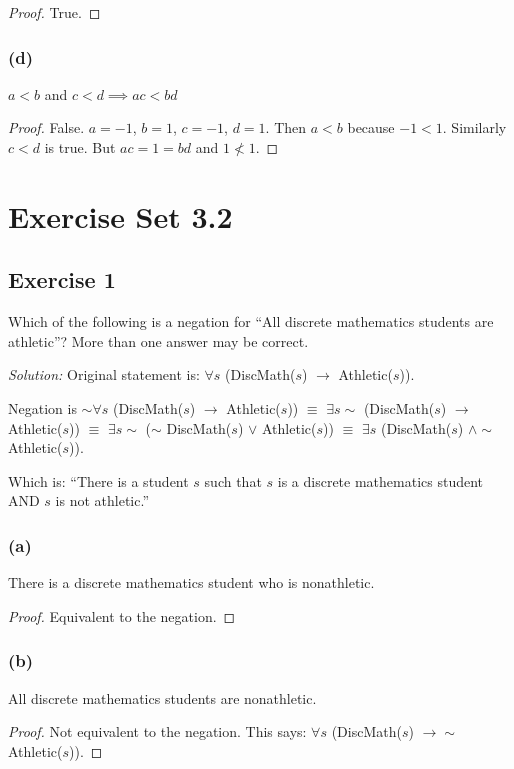 \documentclass[14pt]{extarticle}
\newcommand{\fa}{\forall}
\newcommand{\te}{\exists}
\begin{document}
\begin{proof}
    True.
\end{proof}

\subsubsection{(d)}
$a < b$ and $c < d \implies ac < bd$

\begin{proof}
    False. $a = -1$, $b = 1$, $c = -1$, $d = 1$. Then $a < b$ because $-1 < 1$. Similarly $c < d$ is true. But $ac = 1 = bd$ and $1 \nless 1$.
\end{proof}

\section{Exercise Set 3.2}

\subsection{Exercise 1}
Which of the following is a negation for “All discrete mathematics students are athletic”? More than one answer may be correct.

    {\it Solution:} Original statement is: $\fa s$ (DiscMath($s$) $\to$ Athletic($s$)).

Negation is $\sim \fa s$ (DiscMath($s$) $\to$ Athletic($s$)) $\equiv$ $\te s \sim$ (DiscMath($s$) $\to$ Athletic($s$)) $\equiv$ $\te s \sim$ ($\sim$ DiscMath($s$) $\vee$ Athletic($s$)) $\equiv$ $\te s$ (DiscMath($s$) $\wedge \sim$ Athletic($s$)).

Which is: ``There is a student $s$ such that $s$ is a discrete mathematics student AND $s$ is not athletic.''

\subsubsection{(a)}
There is a discrete mathematics student who is nonathletic.

\begin{proof}
    Equivalent to the negation.
\end{proof}

\subsubsection{(b)}
All discrete mathematics students are nonathletic.

\begin{proof}
    Not equivalent to the negation. This says: $\fa s$ (DiscMath($s$) $\to\sim$ Athletic($s$)).
\end{proof}
\end{document}
